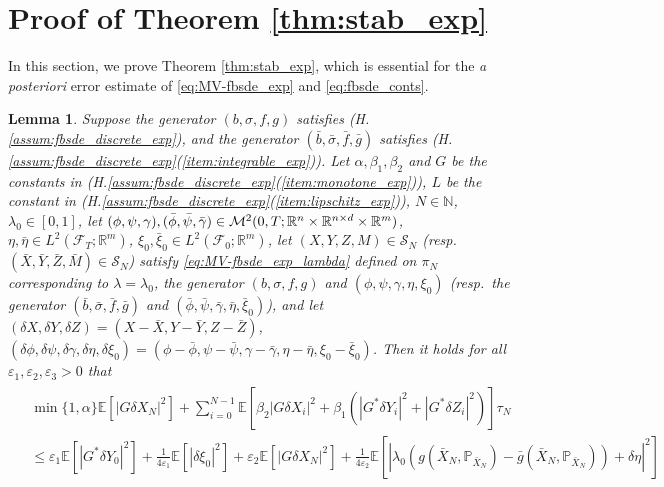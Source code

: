 \documentclass[11pt]{article}
\numberwithin{equation}{section}
\newtheorem{Lemma}[Theorem]{Lemma}
\theoremstyle{definition}
\theoremstyle{remark}
\def\l{\label}  \def\f{\frac}  \def\fa{\forall}
\def\b{\beta}  \def\a{\alpha} \def\ga{\gamma}
\def\eps{\varepsilon}
\def\cF{\mathcal{F}}
\def\cM{\mathcal{M}}
\def\cS{\mathcal{S}}
\def\sE{{\mathbb{E}}}
\def\sN{{\mathbb{N}}}
\def\sP{\mathbb{P}}
\def\sR{{\mathbb R}}
\begin{document}
\color{black}







\section{Proof of Theorem \ref{thm:stab_exp}}\l{sec:proof_stab_exp}
In this section, we prove Theorem \ref{thm:stab_exp},
which is essential 
for the  \textit{a posteriori} error estimate of \eqref{eq:MV-fbsde_exp} and \eqref{eq:fbsde_conts}.


\begin{Lemma}\l{lemma:stab_a_priori_exp}
Suppose the generator $(b,\sigma,f,g)$ satisfies (H.\ref{assum:fbsde_discrete_exp}),
and the generator $(\bar{b},\bar{\sigma},\bar{f},\bar{g})$ 
satisfies
(H.\ref{assum:fbsde_discrete_exp}(\ref{item:integrable_exp})).
Let 
 $\a,\b_1,\b_2$ and $G$ be the constants in  (H.\ref{assum:fbsde_discrete_exp}(\ref{item:monotone_exp})),
 $L$ be the constant in (H.\ref{assum:fbsde_discrete_exp}(\ref{item:lipschitz_exp})),
 $N\in \sN$, $\lambda_0\in [0,1]$,
 let 
 $(\phi,\psi,\gamma),(\bar{\phi},\bar{\psi},\bar{\gamma})\in \cM^2(0,T; \sR^n\t \sR^{n\t d}\t \sR^m)$, 
 $\eta,\bar{\eta}\in L^2(\cF_T;\sR^m)$,
  $\xi_0,\bar{\xi}_0\in L^2(\cF_0;\sR^m)$,
 let 
$(X,Y, Z, M)\in 
\cS_N$
(resp.~$(\bar{X},\bar{Y}, \bar{Z}, \bar{M})\in 
\cS_N$)
satisfy \eqref{eq:MV-fbsde_exp_lambda}
defined on  $\pi_N$ 
corresponding to  
$\lambda=\lambda_0$,
 the generator $(b,\sigma,f,g)$
 and 
$(\phi,\psi,\gamma, \eta,\xi_0)$
(resp.~the generator $(\bar{b},\bar{\sigma},\bar{f},\bar{g})$
 and  
$(\bar{\phi},\bar{\psi},\bar{\gamma},\bar{\eta},\bar{\xi}_0)$),
and
let 
$(\delta X,\delta Y, \delta Z)= ( X-\bar{X}, Y-\bar{Y}, Z-\bar{Z})$,
$(\delta \phi, \delta \psi,\delta \gamma, \delta \eta, \delta \xi_0)= (\phi-\bar{\phi},\psi-\bar{\psi},\gamma-\bar{\gamma},\eta-\bar{\eta}, \xi_0-\bar{\xi}_0)$.
Then it holds for all 
 $\eps_1,\eps_2,\eps_3>0$
  that
\begin{align*}
\begin{split}
&\min\{1,\a\} \sE[
|G\delta X_{N}|^2]
+
 \sum_{i=0}^{N-1}
  \sE[
\beta_2|G\delta X_{i}|^2
+
\beta_1(
|G^*\delta Y_i|^2+|G^*\delta Z_{i}|^2
) ]\tau_N
\\
& \le
\eps_1\sE[ |G^*\delta Y_0|^2]
+\frac{1}{4\eps_1}\sE[ | \delta \xi_0|^2]
+
\eps_2
\sE[ |G\delta X_N|^2]
+
\frac{1}{4\eps_2}\sE[ |\lambda_0(g(\bar{X}_N,\sP_{\bar{X}_N})-\bar{g}(\bar{X}_N,\sP_{\bar{X}_N}))
+\delta \eta|^2]
\\

\end{split}
\end{align*}
\end{Lemma}
\end{document}
